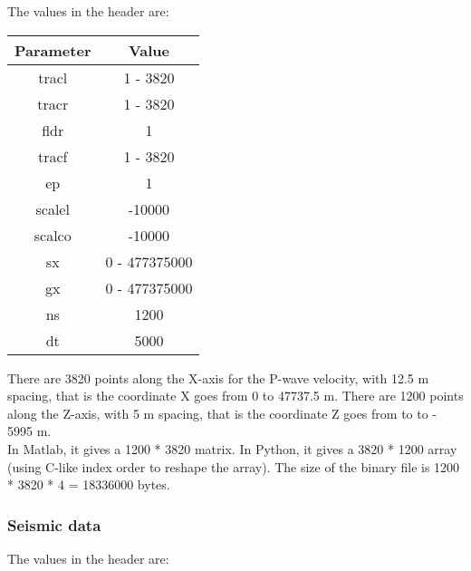 \documentclass{article}
\begin{document}
The values in the header are:

\begin{center}
\begin{tabular}{|c|c|}
\hline
Parameter & Value \\
\hline
tracl & 1 - 3820 \\
tracr & 1 - 3820 \\
fldr & 1 \\
tracf & 1 - 3820 \\
ep & 1 \\
scalel & -10000 \\
scalco & -10000 \\
sx & 0 - 477375000 \\
gx & 0 - 477375000 \\
ns & 1200 \\
dt & 5000 \\
\hline
\end{tabular}
\end{center}

There are 3820 points along the X-axis for the P-wave velocity, with 12.5 m spacing, that is the coordinate X goes from 0 to 47737.5 m. There are 1200 points along the Z-axis, with 5 m spacing, that is the coordinate Z goes from to to - 5995 m.\\

In Matlab, it gives a 1200 * 3820 matrix. In Python, it gives a 3820 * 1200 array (using C-like index order to reshape the array). The size of the binary file is 1200 * 3820 * 4 = 18336000 bytes.

\subsubsection{Seismic data}

The values in the header are:
\end{document}
